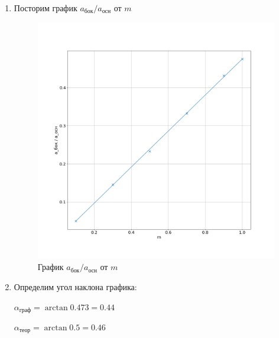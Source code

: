 \documentclass[a4paper, 12pt]{article}
\begin{document}
\begin{enumerate}
        \item Посторим график  $a_{бок} / a_{осн}$ от $m$
        
        \begin{figure}[!h]
            \includegraphics[scale=0.4]{graph3.png}
            \caption{График $a_{бок} / a_{осн}$ от $m$}
        \end{figure}

        \item Определим угол наклона графика:

        $\alpha_{граф} = \arctan{0.473} = 0.44$

        $\alpha_{теор} = \arctan{0.5}   = 0.46$
    \end{enumerate}
    
\end{document}
